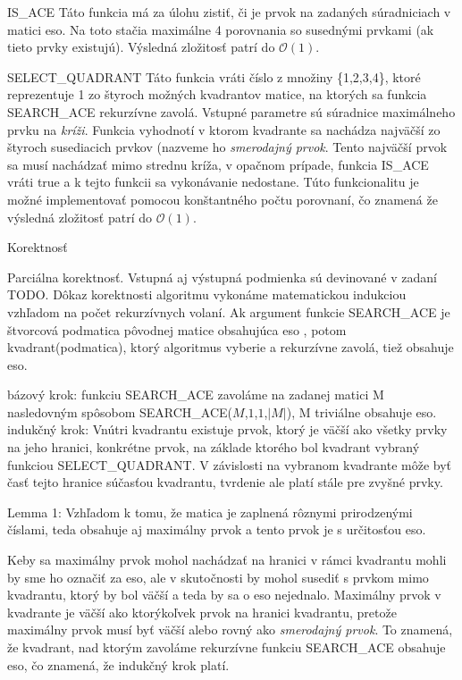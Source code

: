 \documentclass[paper=a4, fontsize=11pt]{scrartcl} %
\numberwithin{equation}{section} %
\numberwithin{figure}{section} %
\numberwithin{table}{section} %
\begin{document}
IS\_ACE
Táto funkcia má za úlohu zistiť, či je prvok na zadaných súradniciach v matici eso. Na toto stačia maximálne 4 porovnania so susednými prvkami (ak tieto prvky existujú).
Výsledná zložitosť patrí do $\mathcal{O}(1)$.

SELECT\_QUADRANT
Táto funkcia vráti číslo z množiny \{1,2,3,4\}, ktoré reprezentuje 1 zo štyroch možných kvadrantov matice, na ktorých sa funkcia SEARCH\_ACE rekurzívne zavolá. Vstupné parametre sú súradnice maximálneho prvku na {\em kríži}. Funkcia vyhodnotí v ktorom kvadrante sa nachádza najväčší zo štyroch susediacich prvkov (nazveme ho {\em smerodajný prvok}. Tento najväčší prvok sa musí nachádzať mimo strednu kríža, v opačnom prípade, funkcia IS\_ACE vráti true a k tejto funkcii sa vykonávanie nedostane. Túto funkcionalitu je možné implementovať pomocou konštantného počtu porovnaní, čo znamená že výsledná zložitosť patrí do $\mathcal{O}(1)$.





Korektnosť

Parciálna korektnosť.
Vstupná aj výstupná podmienka sú devinované v zadaní TODO.
Dôkaz korektnosti algoritmu vykonáme matematickou indukciou vzhľadom na počet rekurzívnych volaní.
Ak argument funkcie SEARCH\_ACE je štvorcová podmatica pôvodnej matice obsahujúca eso , potom kvadrant(podmatica), ktorý algoritmus vyberie a rekurzívne zavolá, tiež obsahuje eso.

bázový krok: funkciu SEARCH\_ACE zavoláme na zadanej matici M nasledovným spôsobom SEARCH\_ACE($M$,$1$,$1$,$|M|$), M triviálne obsahuje eso.
indukčný krok: 
Vnútri kvadrantu existuje prvok, ktorý je väčší ako všetky prvky na jeho hranici, konkrétne prvok, na základe ktorého bol kvadrant vybraný funkciou SELECT\_QUADRANT. V závislosti na vybranom kvadrante môže byť časť tejto hranice súčasťou kvadrantu, tvrdenie ale platí stále pre zvyšné prvky. 

Lemma 1: Vzhľadom k tomu, že matica je zaplnená rôznymi prirodzenými číslami, teda obsahuje aj maximálny prvok a tento prvok je s určitosťou eso.

Keby sa maximálny prvok mohol nachádzať na hranici v rámci kvadrantu mohli by sme ho označiť za eso, ale v skutočnosti by mohol susediť s prvkom mimo kvadrantu, ktorý by bol väčší a teda by sa o eso nejednalo. Maximálny prvok v kvadrante je väčší ako ktorýkoľvek prvok na hranici kvadrantu, pretože maximálny prvok musí byť väčší alebo rovný ako {\em smerodajný prvok}. To znamená, že kvadrant, nad ktorým zavoláme rekurzívne funkciu SEARCH\_ACE obsahuje eso, čo znamená, že indukčný krok platí.
\end{document}
